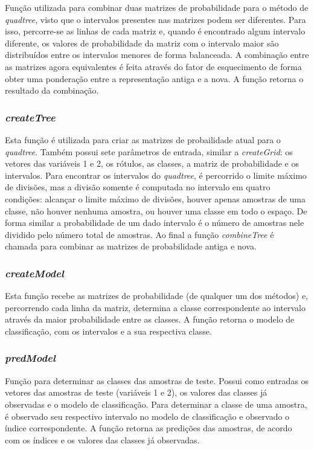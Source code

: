 \documentclass[conference]{IEEEtran}
\begin{document}
Função utilizada para combinar duas matrizes de probabilidade para o método de \textit{quadtree}, visto que o intervalos presentes nas matrizes podem ser diferentes. Para isso, percorre-se as linhas de cada matriz e, quando é encontrado algum intervalo diferente, os valores de probabilidade da matriz com o intervalo maior são distribuídos entre os intervalos menores de forma balanceada. A combinação entre as matrizes agora equivalentes é feita através do fator de esquecimento de forma obter uma ponderação entre a representação antiga e a nova. A função retorna o resultado da combinação.

\subsubsection{\textit{createTree}} \label{metod_23}

Esta função é utilizada para criar as matrizes de probailidade atual para o \textit{quadtree}. Também possui sete parâmetros de entrada, similar a \textit{createGrid}: os vetores das variáveis 1 e 2, os rótulos, as classes, a matriz de probabilidade e os intervalos. Para encontrar os intervalos do \textit{quadtree}, é percorrido o limite máximo de divisões, mas a divisão somente é computada no intervalo em quatro condições: alcançar o limite máximo de divisões, houver apenas amostras de uma classe, não houver nenhuma amostra, ou houver uma classe em todo o espaço. De forma similar a probabilidade de um dado intervalo é o número de amostras nele dividido pelo número total de amostras. Ao final a função \textit{combineTree} é chamada para combinar as matrizes de probabilidade antiga e nova.

\subsubsection{\textit{createModel}} \label{metod_24}

Esta função recebe as matrizes de probabilidade (de qualquer um dos métodos) e, percorrendo cada linha da matriz, determina a classe correspondente ao intervalo através da maior probabilidade entre as classes. A função retorna o modelo de classificação, com os intervalos e a sua respectiva classe.

\subsubsection{\textit{predModel}} \label{metod_25}

Função para determinar as classes das amostras de teste. Possui como entradas os vetores das amostras de teste (variáveis 1 e 2), os valores das classes já observadas e o modelo de classificação. Para determinar a classe de uma amostra, é observado seu respectivo intervalo no modelo de classificação e observado o índice correspondente. A função retorna as predições das amostras, de acordo com os índices e os valores das classes já observadas.
\end{document}
